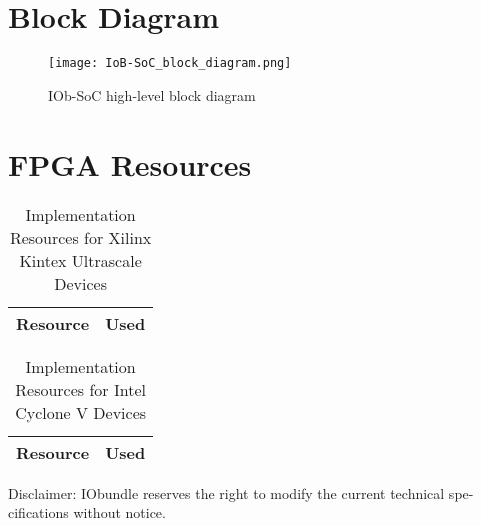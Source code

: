 \documentclass[twocolumn]{iob_pb}
\begin{document}
\section*{\textcolor[rgb]{0,0,0}{Block Diagram}}

\begin{figure}[H]
  \begin{center}
    \texttt{[image: IoB-SoC\_block\_diagram.png]}
    \caption{IOb-SoC high-level block diagram}
    \label{fig:IOb-SoC}
  \end{center}
\end{figure}




\section*{FPGA Resources}
\begin{table}[H]
  \begin{center}
    \begin{tabular}{|l|r|}
      \hline
%      
      \rowcolor{iob-green}
      \textbf{Resource}  & \textbf{Used} \\
      \hline
      \hline

       

    \end{tabular}
    \caption{Implementation Resources for Xilinx Kintex Ultrascale Devices}
    \label{tab:res-xil}
  \end{center}
\end{table}


\begin{table}[H]
  \begin{center}
    \begin{tabular}{|l|r|}
      \hline

      \rowcolor{iob-green}
      \textbf{Resource}  & \textbf{Used} \\
      \hline
      \hline

       
        
    \end{tabular}
    \caption{Implementation Resources for Intel Cyclone V Devices}
    \label{tab:res-alt}
  \end{center}
\end{table}

\vspace*{0.5cm}
\noindent
\begin{scriptsize}
Disclaimer: IObundle reserves the right to modify the current
technical spe-cifications without notice.
\end{scriptsize}
\newpage
\end{document}
